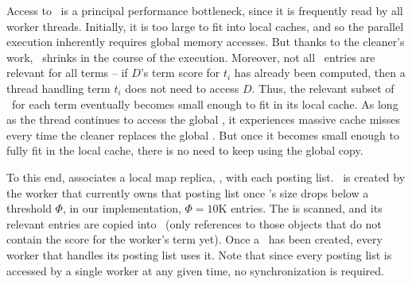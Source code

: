 Access to \DMap\ is a principal performance bottleneck, since it is frequently read by all worker threads. Initially, it is too large to fit into local caches, and so the parallel execution inherently requires global memory accesses. But thanks to the cleaner's work, \DMap\ shrinks in the course of the execution. 
Moreover, not all  \DMap\ entries are relevant for all terms -- if $D$'s term score for $t_i$ has already been computed, then a  thread handling term $t_i$ does not need to access $D$.
Thus, the relevant subset of  \DMap\ for each term eventually becomes small enough to fit in its local cache. As long as the thread continues to access the global \DMap,  it  experiences massive cache misses every time the cleaner replaces the global \DMap. 
But 
once it becomes small enough to fully fit in the local cache, there is no need to keep using the global copy. 

To this end, \alg\/ associates a local map replica, \TMap, with each posting list. \TMap\ is created by the worker that currently owns that posting list once \DMap's size drops below a threshold $\Phi$,
in our implementation, $\Phi=10$K entries. The \DMap is scanned, and its relevant entries are copied  into \TMap\ (only references to those \Docobj{} objects that do not contain the score for the worker's term yet).  Once a \TMap\ has been created, every worker that handles its posting list uses it.
Note that since every posting list is accessed by a single worker at any given time, no synchronization is required.


